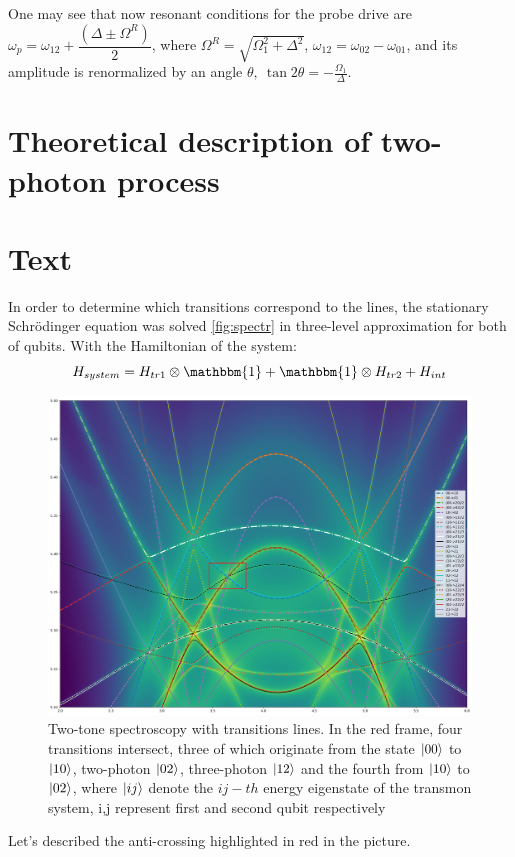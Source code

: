 \documentclass[%
 aip,
 amsmath,amssymb,
 reprint,%
]{revtex4-1}
\begin{document}
One may see that now resonant conditions for the probe drive are $\omega_p = \omega_{12} + \dfrac{(\Delta \pm \Omega^R)}{2}$, where $\Omega^R = \sqrt{\Omega_1^2 + \Delta^2}$, $\omega_{12} = \omega_{02}- \omega_{01}$, and its amplitude is renormalized by an angle $\theta,\ \tan 2\theta = -\frac{\Omega_1}{\Delta}$.





\section{Theoretical description of two-photon process}





\section{Text}


In order to determine which transitions correspond to the lines, the stationary Schrödinger equation was solved \autoref{fig:spectr} in three-level approximation for both of qubits. With the Hamiltonian of the system:
\begin{equation}
	H_{system} = H_{tr1}\otimes\mathbbm{1}+\mathbbm{1}\otimes H_{tr2}+H_{int}
\end{equation}
\begin{figure}[h]
	\centering
	\includegraphics[width=\linewidth]{spectr}
	\caption{Two-tone spectroscopy with transitions lines. In the red frame, four transitions intersect, three of which originate from the state $\ket{00}$ to $\ket{10}$, two-photon
		$\ket{02}$, three-photon
		$\ket{12}$ and the fourth from  $\ket{10}$ to  $\ket{02}$, where $\ket{ij}$ denote the $ij-th$ energy eigenstate of the transmon system, i,j represent first and second qubit respectively}
	\label{fig:spectr}
\end{figure}


 Let's described the anti-crossing highlighted in red in the picture. 
 



\end{document}

